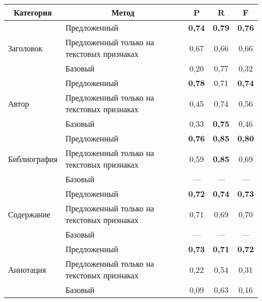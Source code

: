 \begin{multicols}{2}
\setcounter{figure}{1}

\begin{table*}\small %
\begin{center}
\vspace*{2ex}

    \begin{tabular}{|l|l|c|c|c|}
        \hline
\multicolumn{1}{|c|}{Категория}&\multicolumn{1}{c|}{Метод} &
{P} &
{R} &
{F} \\
\hline
      & 
                  {Предложенный} & \textbf{0,74}&
\textbf{0,79} &
        \textbf{0,76} \\
     {Заголовок}   & Предложенный только на текстовых 
признаках & 0,67 &
        0,66 &
        0,66 \\
        & Базовый & 0,20 &
0,77 &
    0,32 \\
        \hline
 & {Предложенный} & \textbf{0,78}&
0,71 &
    \textbf{0,74} \\
       {Автор}  & Предложенный только на текстовых 
признаках & 0,45 &
        0,74 &
        0,56 \\
        & Базовый & 0,33 &
        \textbf{0,75} &
        0,46 \\
                \hline
 &  
        {Предложенный} & \textbf{0,76} 
&\textbf{0,85} &
\textbf{0,80} \\
              Библиография  & Предложенный только на текстовых 
признаках & 0,59 &
        \textbf{0,85} &
0,69 \\
        & {Базовый} & ---& ---&    --- \\
           \hline
& Предложенный & \textbf{0,72} 
&
\textbf{0,74} &
        \textbf{0,73} \\
         {Содержание}    & Предложенный только на текс\-то\-вых 
признаках & 0,71 & 0,69 & 0,70 \\
        & Базовый & --- & --- &--- \\
        \hline
 &  {Предложенный} & \textbf{0,73}  &
\textbf{0,71} & \textbf{0,72} \\
     Аннотация   & Предложенный только на текс\-то\-вых 
признаках & 0,22 & 0,54 & 0,31 \\
        & Базовый & 0,09 & 0,63 & 0,16 \\
                \hline
            \end{tabular}
    \end{center}
    \vspace*{-6pt}
\end{table*}



\end{multicols}
